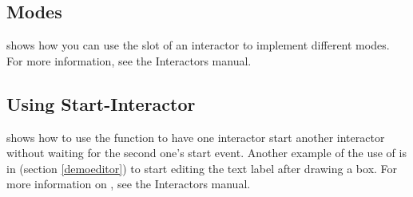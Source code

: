 \subsection{Modes}

 shows how you can use the  slot of an interactor
to implement different modes.  For more information, see the Interactors manual.

\subsection{Using Start-Interactor}

 shows how to use the 
function to have one interactor start another interactor without waiting
for the second one's start event.  Another example of the use of
 is in  (section
\ref{demoeditor}) to start editing the text label after drawing a box.
For more information on , see the Interactors manual.

